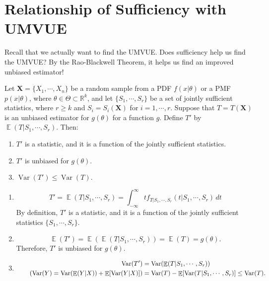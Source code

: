 \documentclass{huhtakm-template-book-v2}
\DeclareMathOperator{\E}{\mathbb{E}}
\DeclareMathOperator{\Var}{Var}
\begin{document}
\section{Relationship of Sufficiency with UMVUE}
    Recall that we actually want to find the UMVUE. Does sufficiency help us find the UMVUE? By the Rao-Blackwell Theorem, it helps us find an improved unbiased estimator!
    \begin{thm}
        Let $\mathbf{X}=\{X_{1},\cdots,X_{n}\}$ be a random sample from a PDF $f(x|\theta)$ or a PMF $p(x|\theta)$, where $\theta\in\Theta\subset\mathbb{R}^{k}$, and let $\{S_{1},\cdots,S_{r}\}$ be a set of jointly sufficient statistics, where $r\geq k$ and $S_{i}=S_{i}(\mathbf{X})$ for $i=1,\cdots,r$. Suppose that $T=T(\mathbf{X})$ is an unbiased estimator for $g(\theta)$ for a function $g$. Define $T'$ by $\E(T|S_{1},\cdots,S_{r})$. Then:
        \begin{enumerate}
            \item $T'$ is a statistic, and it is a function of the jointly sufficient statistics.
            \item $T'$ is unbiased for $g(\theta)$.
            \item $\Var(T')\leq\Var(T)$.
        \end{enumerate}
    \end{thm}
    \begin{proofing}
        \begin{enumerate}
            \item 
            \begin{equation*}
                T'=\E(T|S_{1},\cdots,S_{r})=\int_{-\infty}^\infty tf_{T|S_{1},\cdots,S_{r}}(t|S_{1},\cdots,S_{r})\,dt
            \end{equation*}
            By definition, $T'$ is a statistic, and it is a function of the jointly sufficient statistics $\{S_{1},\cdots,S_{r}\}$.
            \item 
            \begin{equation*}
                \E(T')=\E(\E(T|S_{1},\cdots,S_{r}))=\E(T)=g(\theta).
            \end{equation*}
            Therefore, $T'$ is unbiased for $g(\theta)$.
            \item 
            \begin{align*}
                \Var(T')&=\Var(\E(T|S_{1},\cdots,S_{r}))\\
                \tag{$\Var(Y)=\Var(\E(Y|X))+\E[\Var(Y|X)]$}
                &=\Var(T)-\E[\Var(T|S_{1},\cdots,S_{r})]\leq\Var(T).
            \end{align*}
        \end{enumerate}
    \end{proofing}
\end{document}
